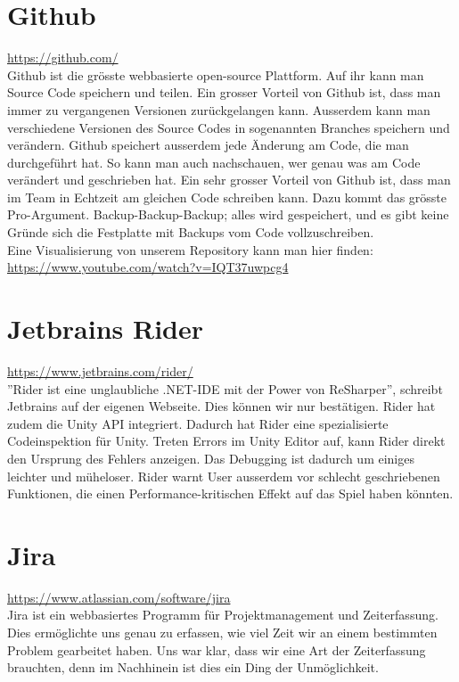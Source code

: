 \section{Github}
\url{https://github.com/}\\
Github ist die grösste webbasierte open-source Plattform. Auf ihr kann man Source Code speichern und teilen. Ein grosser Vorteil von Github ist, dass man immer zu vergangenen Versionen zurückgelangen kann.
Ausserdem kann man verschiedene Versionen des Source Codes in sogenannten Branches speichern und verändern. Github speichert ausserdem jede Änderung am Code, die man durchgeführt hat. So kann man auch nachschauen,
wer genau was am Code verändert und geschrieben hat. Ein sehr grosser Vorteil von Github ist, dass man im Team in Echtzeit am gleichen Code schreiben kann. Dazu kommt das grösste Pro-Argument. Backup-Backup-Backup; 
alles wird gespeichert, und es gibt keine Gründe sich die Festplatte mit Backups vom Code vollzuschreiben. \\
Eine Visualisierung von unserem Repository kann man hier finden: \url{https://www.youtube.com/watch?v=IQT37uwpcg4}


\section{Jetbrains Rider}
\url{https://www.jetbrains.com/rider/}\\
''Rider ist eine unglaubliche .NET-IDE mit der Power von ReSharper'', schreibt Jetbrains auf der eigenen Webseite. Dies können wir nur bestätigen. Rider hat zudem die Unity API integriert. Dadurch hat Rider eine
spezialisierte Codeinspektion für Unity. Treten Errors im Unity Editor auf, kann Rider direkt den Ursprung des Fehlers anzeigen. Das Debugging ist dadurch um einiges leichter und müheloser. 
Rider warnt User ausserdem vor schlecht geschriebenen Funktionen, die einen Performance-kritischen Effekt auf das Spiel haben könnten. 


\section{Jira}
\url{https://www.atlassian.com/software/jira}\\
Jira ist ein webbasiertes Programm für Projektmanagement und Zeiterfassung. Dies ermöglichte uns genau zu erfassen, wie viel Zeit wir an einem bestimmten Problem gearbeitet haben. Uns war klar, dass wir eine Art 
der Zeiterfassung brauchten, denn im Nachhinein ist dies ein Ding der Unmöglichkeit.


